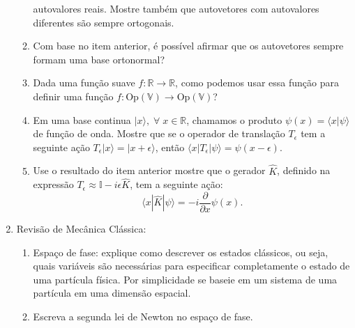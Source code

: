 \begin{enumerate}
\begin{enumerate}
		            autovalores reais. Mostre também que autovetores com autovalores diferentes
		            são sempre ortogonais.
		      \item Com base no item anterior, é possível afirmar que os autovetores
		            sempre formam uma base ortonormal?
		      \item Dada uma função suave $f:\mathbb{R}\to\mathbb{R}$, como podemos usar
		            essa função para definir uma função
		            $f:\mathrm{Op}\left(\mathbb{V}\right)\to\mathrm{Op}\left(\mathbb{V}\right)$?
		      \item Em uma base continua $|x\rangle,\;\forall\;x\in\mathbb{R}$, chamamos
		            o produto $\psi(x) = \langle x|\psi\rangle$ de função de onda.
		            Mostre que se o operador de translação $T_\epsilon$ tem a seguinte
		            ação $T_\epsilon|x\rangle = |x+\epsilon\rangle$, então $\langle
			            x|T_\epsilon|\psi\rangle = \psi(x-\epsilon)$.
		      \item Use o resultado do item anterior mostre que o gerador $\hat{K}$,
		            definido na expressão $T_\epsilon \approx \mathbb{I} - i \epsilon
			            \hat{K}$, tem a seguinte ação: $$\langle x|\hat{K}|\psi\rangle =
			            -i\frac{\partial}{\partial x}\psi(x).$$
	      \end{enumerate}
	\item Revisão de Mecânica Clássica:
	      \begin{enumerate}
		      \item Espaço de fase: explique como descrever os estados clássicos, ou seja, quais variáveis são necessárias para especificar completamente o estado de uma partícula física. Por simplicidade se baseie em um sistema de uma partícula em uma dimensão espacial.
		      \item Escreva a segunda lei de Newton no espaço de fase.
	      \end{enumerate}
\end{enumerate}


